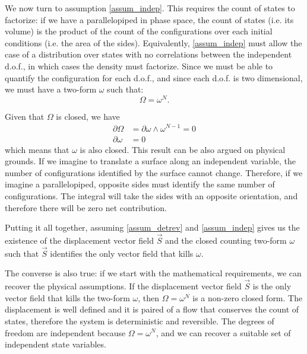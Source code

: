 \documentclass[10pt,twocolumn, nofootinbib]{revtex4-2}
\begin{document}
We now turn to assumption \ref{assum_indep}. This requires the count of states to factorize: if we have a parallelopiped in phase space, the count of states (i.e. its volume) is the product of the count of the configurations over each initial conditions (i.e. the area of the sides). Equivalently, \ref{assum_indep} must allow the case of a distribution over states with no correlations between the independent d.o.f., in which cases the density must factorize. Since we must be able to quantify the configuration for each d.o.f., and since each d.o.f. is two dimensional, we must have a two-form $\omega$ such that:
\begin{equation}
	\Omega = \omega^N.
\end{equation}

Given that $\Omega$ is closed, we have
\begin{equation}
	\begin{aligned}
		\partial \Omega &= \partial \omega \wedge \omega^{N-1} = 0 \\
		\partial \omega &= 0
	\end{aligned}
\end{equation}
which means that $\omega$ is also closed. This result can be also argued on physical grounds. If we imagine to translate a surface along an independent variable, the number of configurations identified by the surface cannot change. Therefore, if we imagine a parallelopiped, opposite sides must identify the same number of configurations. The integral will take the sides with an opposite orientation, and therefore there will be zero net contribution.


Putting it all together, assuming \ref{assum_detrev} and \ref{assum_indep} gives us the existence of the displacement vector field $\vec{S}$ and the closed counting two-form $\omega$ such that $\vec{S}$ identifies the only vector field that kills $\omega$.

The converse is also true: if we start with the mathematical requirements, we can recover the physical assumptions. If the displacement vector field $\vec{S}$ is the only vector field that kills the two-form $\omega$, then $\Omega = \omega^N$ is a non-zero closed form. The displacement is well defined and it is paired of a flow that conserves the count of states, therefore the system is deterministic and reversible. The degrees of freedom are independent because $\Omega = \omega^N$, and we can recover a suitable set of independent state variables.
\end{document}
